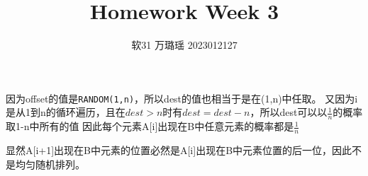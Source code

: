 \documentclass[a4paper,9pt]{article}
\begin{document}
\title{Homework Week 3}
\author{软31 万璐瑶 2023012127}
\maketitle
因为offset的值是\verb|RANDOM(1,n)|，所以dest的值也相当于是在(1,n)中任取。
又因为i是从1到n的循环遍历，且在$dest > n$时有$dest = dest - n$，所以dest可以以$\frac{1}{n}$的概率取1-n中所有的值
因此每个元素A[i]出现在B中任意元素的概率都是$\frac{1}{n}$

显然A[i+1]出现在B中元素的位置必然是A[i]出现在B中元素位置的后一位，因此不是均匀随机排列。
\end{document}
